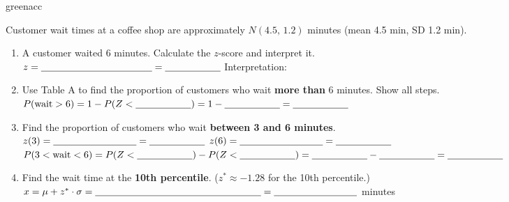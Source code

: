 \documentclass[10pt]{article}
\begin{document}
\vspace{0.12in}

\boxguard
\begin{blurbbox}{greenacc}
\small

Customer wait times at a coffee shop are approximately $N(4.5,\,1.2)$ minutes
(mean 4.5 min, SD 1.2 min).

\vspace{0.10in}

\begin{enumerate}[leftmargin=1.5em, itemsep=8pt]

  \item A customer waited 6 minutes. Calculate the $z$-score and interpret it.\\[5pt]
        $z = \blank{4cm} = \blank{2cm}$\quad
        Interpretation: \writeline

  \item Use Table A to find the proportion of customers who wait \textbf{more than}
        6 minutes. Show all steps.\\[5pt]
        $P(\text{wait} > 6) = 1 - P(Z < \blank{2cm}) = 1 - \blank{2cm} = \blank{2cm}$

  \item Find the proportion of customers who wait \textbf{between 3 and 6 minutes}.\\[5pt]
        $z(3) = \blank{3cm} = \blank{2cm}$\quad
        $z(6) = \blank{3cm} = \blank{2cm}$\\[4pt]
        $P(3 < \text{wait} < 6) = P(Z < \blank{2cm}) - P(Z < \blank{2cm}) = \blank{2cm} - \blank{2cm} = \blank{2cm}$

  \item Find the wait time at the \textbf{10th percentile}.
        ($z^* \approx -1.28$ for the 10th percentile.)\\[5pt]
        $x = \mu + z^* \cdot \sigma = \blank{6cm} = \blank{3cm}$ minutes

\end{enumerate}

\end{blurbbox}

\vspace{0.12in}
\end{document}
